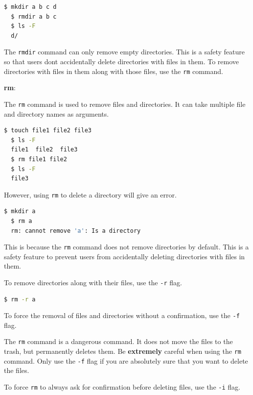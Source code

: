 \begin{lstlisting}[language=bash]
  $ mkdir a b c d
  $ rmdir a b c
  $ ls -F
  d/
\end{lstlisting}

\begin{remark}
  The \texttt{rmdir} command can only remove empty directories.
  This is a safety feature so that users dont accidentally delete directories with files in them.
  To remove directories with files in them along with those files, use the \texttt{rm} command.
\end{remark}

\textbf{rm}:

The \texttt{rm} command is used to remove files and directories.
It can take multiple file and directory names as arguments.

\begin{lstlisting}[language=bash]
  $ touch file1 file2 file3
  $ ls -F
  file1  file2  file3
  $ rm file1 file2
  $ ls -F
  file3
\end{lstlisting}

However, using \texttt{rm} to delete a directory will give an error.

\begin{lstlisting}[language=bash]
  $ mkdir a
  $ rm a
  rm: cannot remove 'a': Is a directory
\end{lstlisting}

This is because the \texttt{rm} command does not remove directories by default.
This is a safety feature to prevent users from accidentally deleting directories with files in them.

To remove directories along with their files, use the \texttt{-r} flag.

\begin{lstlisting}[language=bash]
  $ rm -r a
\end{lstlisting}

To force the removal of files and directories without a confirmation, use the \texttt{-f} flag.

\begin{warn}
  The \texttt{rm} command is a dangerous command.
  It does not move the files to the trash, but permanently deletes them.
  Be \textbf{extremely} careful when using the \texttt{rm} command.
  Only use the \texttt{-f} flag if you are absolutely sure that you want to delete the files.
\end{warn}

To force \texttt{rm} to always ask for confirmation before deleting files, use the \texttt{-i} flag.

